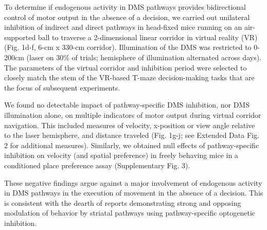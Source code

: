 To determine if endogenous activity in DMS pathways provides bidirectional control of motor output in the absence of a decision, we carried out unilateral inhibition of indirect and direct pathways in head-fixed mice running on an air-supported ball to traverse a 2-dimensional linear corridor in virtual reality (VR) (Fig. 1d-f, 6-cm x 330-cm corridor). Illumination of the DMS was restricted to 0-200cm (laser on 30\% of trials; hemisphere of illumination alternated across days). The parameters of the virtual corridor and inhibition period were selected to closely match the stem of the VR-based T-maze decision-making tasks that are the focus of subsequent experiments.

We found no detectable impact of pathway-specific DMS inhibition, nor DMS illumination alone, on multiple indicators of motor output during virtual corridor navigation. This included measures of velocity, x-position or view angle relative to the laser hemisphere, and distance traveled (Fig. 1g-j; see Extended Data Fig. 2 for additional measures). Similarly, we obtained null effects of pathway-specific inhibition on velocity (and spatial preference) in freely behaving mice in a conditioned place preference assay (Supplementary Fig. 3). 

These negative findings argue against a major involvement of endogenous activity in DMS pathways in the execution of movement in the absence of a decision. This is consistent with the dearth of reports demonstrating strong and opposing modulation of behavior by striatal pathways using pathway-specific optogenetic inhibition. 
